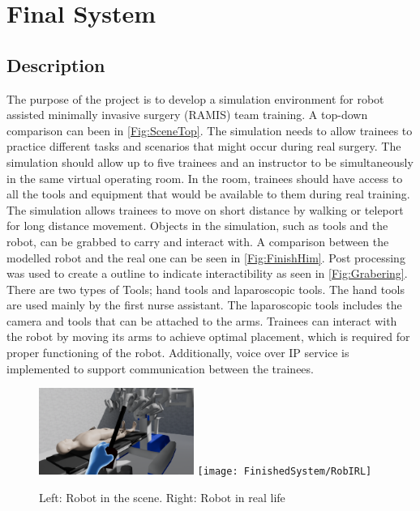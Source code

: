 \chapter{Final System}
\section*{Description} 
The purpose of the project is to develop a simulation environment for robot assisted minimally invasive surgery (RAMIS) team training. A top-down comparison can been in \autoref{Fig:SceneTop}. The simulation needs to allow trainees to practice different tasks and scenarios that might occur during real surgery.
The simulation should allow up to five trainees and an instructor to be simultaneously in the same virtual operating room. In the room, trainees should have access to all the tools and equipment that would be available to them during real training.
The simulation allows trainees to move on short distance by walking or teleport for long distance movement. Objects in the simulation, such as tools and the robot, can be grabbed to carry and interact with. A comparison between the modelled robot and the real one can be seen in \autoref{Fig:FinishHim}. Post processing was used to create a outline to indicate interactibility as seen in \autoref{Fig:Grabering}. There are two types of Tools; hand tools and laparoscopic tools. The hand tools are used mainly by the first nurse assistant. The laparoscopic tools includes the camera and tools that can be attached to the arms. Trainees can interact with the robot by moving its arms to achieve optimal placement, which is required for proper functioning of the robot. Additionally, voice over IP service is implemented to support communication between the trainees. 


\begin{figure}
\includegraphics[width=0.45\textwidth]{FinishedSystem/RobInGame}
\texttt{[image: FinishedSystem/RobIRL]}
\caption{Left: Robot in the scene. Right: Robot in real life}
\label{Fig:FinishHim}
\end{figure}

